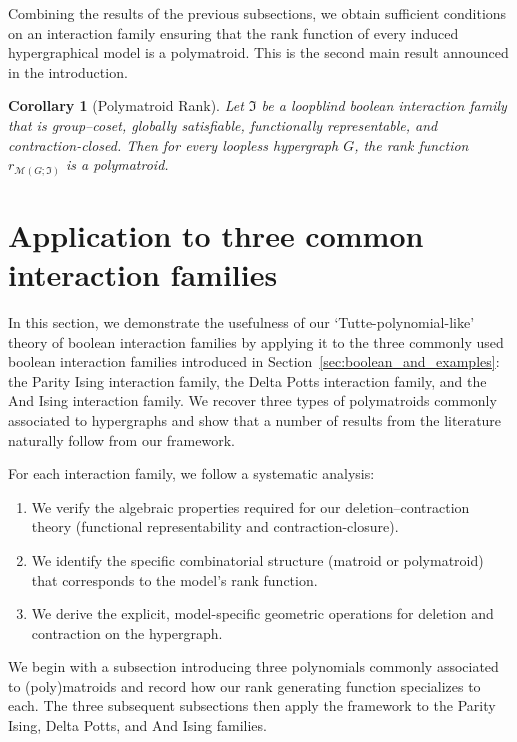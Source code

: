 \documentclass[11pt,reqno]{amsart}
\newcommand{\Mo}{\mathcal{M}}
\newcommand{\IFam}{\mathfrak{I}}
\theoremstyle{plain}
\newtheorem{corollary}[theorem]{Corollary}
\theoremstyle{definition}
\numberwithin{equation}{section}
\begin{document}
Combining the results of the previous subsections, we obtain
sufficient conditions on an interaction family ensuring that the
rank function of every induced hypergraphical model is a
polymatroid. This is the second main result announced in the
introduction.

\begin{corollary}[Polymatroid Rank]
    \label{cor:rank_is_polymatroid}
    Let $\IFam$ be a loopblind boolean interaction family
    that is group--coset, globally satisfiable, functionally
    representable, and contraction-closed. Then for every loopless
    hypergraph $G$, the rank function $r_{\Mo(G; \IFam)}$
    is a polymatroid.
\end{corollary}


\section{Application to three common interaction families}
\label{sec:example-interaction-families}
In this section, we demonstrate the usefulness of our `Tutte-polynomial-like' theory of boolean interaction families by applying it to the three commonly used boolean interaction families introduced in Section~\ref{sec:boolean_and_examples}: the Parity Ising interaction family, the Delta Potts interaction family, and the And Ising interaction family. We recover three types of polymatroids commonly associated to hypergraphs and show that a number of results from the literature naturally follow from our framework.

For each interaction family, we follow a systematic analysis:
\begin{enumerate}
    \item We verify the algebraic properties required for our deletion--contraction theory (functional representability and contraction-closure).
    \item We identify the specific combinatorial structure (matroid or polymatroid) that corresponds to the model's rank function.
    \item We derive the explicit, model-specific geometric operations for deletion and contraction on the hypergraph.
\end{enumerate}

We begin with a subsection introducing three polynomials commonly associated to (poly)matroids and record how our rank generating function specializes to each. The three subsequent subsections then apply the framework to the Parity Ising, Delta Potts, and And Ising families.
\end{document}
